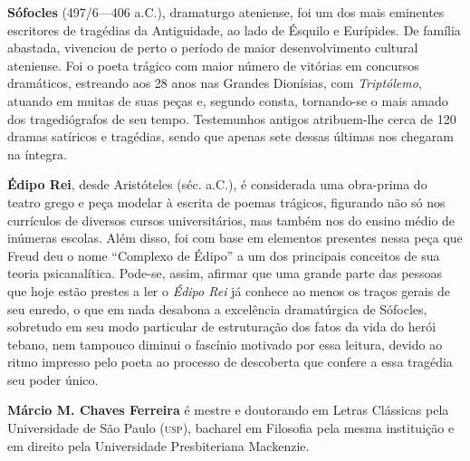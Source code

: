 \textbf{Sófocles} (497/6---406 a.C.), dramaturgo ateniense, foi um dos mais eminentes 
escritores de tragédias da Antiguidade, ao lado de Ésquilo e Eurípides. De família abastada, vivenciou de perto 
o período de maior desenvolvimento cultural ateniense. Foi o poeta trágico com maior 
número de vitórias em concursos dramáticos, estreando aos 28 anos nas Grandes Dionísias, com \textit{Triptólemo}, 
atuando em muitas de suas peças e, segundo consta, tornando-se o mais amado dos tragediógrafos de seu tempo. 
Testemunhos antigos atribuem-lhe cerca de 120 dramas satíricos e tragédias, sendo que apenas sete dessas últimas nos chegaram na íntegra. 


\textbf{Édipo Rei}, desde Aristóteles (séc.  a.C.), é considerada uma
obra-prima do teatro grego e peça modelar à escrita de poemas trágicos, 
figurando não só nos currículos de diversos
cursos universitários, mas também nos do ensino médio de inúmeras
escolas. Além disso, foi com base em elementos presentes nessa
peça que Freud deu o nome ``Complexo de Édipo'' a um dos principais
conceitos de sua teoria psicanalítica. Pode-se, assim, afirmar que uma grande 
parte das pessoas que hoje estão prestes
a ler o \textit{Édipo Rei} já conhece ao menos os traços
gerais de seu enredo, o que em nada desabona a excelência dramatúrgica de Sófocles,
sobretudo em seu modo particular de estruturação dos fatos da vida do herói
tebano, nem tampouco diminui o fascínio motivado por essa leitura, 
devido ao ritmo impresso pelo poeta ao processo de descoberta que
confere a essa tragédia seu poder único.


\textbf{Márcio M. Chaves Ferreira} é mestre e doutorando em Letras Clássicas pela Universidade 
de São Paulo (\textsc{usp}), bacharel em Filosofia pela mesma instituição e em direito pela 
Universidade Presbiteriana Mackenzie.